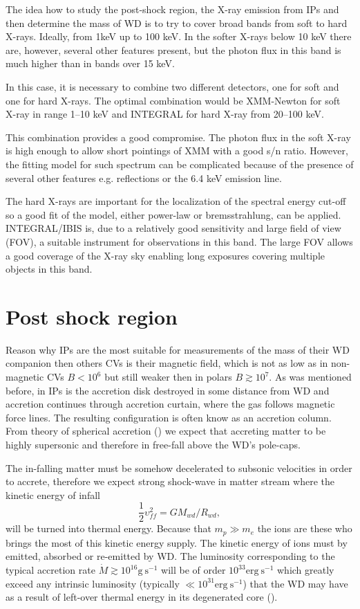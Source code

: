 \documentclass[oneside,a4paper,11pt]{report}
\begin{document}
The idea how to study the post-shock region, the X-ray emission from IPs and then 
determine the mass of WD is to try to cover broad bands from soft to hard X-rays. Ideally, 
from 1keV up to 100 keV. In the softer X-rays below 10 keV there are, however, several other features 
present, but the photon flux in this band is much higher than in bands over 15 keV. 

In this case, it is necessary to combine two different detectors, one for soft and one 
for hard X-rays. The optimal combination would be XMM-Newton for soft X-ray in range 1–10 keV 
and INTEGRAL for hard X-ray from 20–100 keV. 

This combination provides a good compromise. The photon flux in the soft X-ray is high enough 
to allow short pointings of XMM with a good s/n ratio. However, the fitting model for such spectrum 
can be complicated because of the presence of several other features e.g. reflections or the 6.4 keV 
emission line.

The hard X-rays are important for the localization of the spectral energy cut-off so a good fit 
of the model, either power-law or bremsstrahlung, can be applied. INTEGRAL/IBIS is, 
due to a relatively good sensitivity and large field of view (FOV), a suitable instrument 
for observations in this band. The large FOV allows a good coverage 
of the X-ray sky enabling long exposures covering multiple objects in this band.  

\section{Post shock region}
Reason why IPs are the most suitable for measurements of the mass of their WD companion then others CVs 
is their magnetic field, which is not as low as in non-magnetic CVs $B<10^6$ but still weaker then in 
polars $B\gtrsim10^7$. 
As was mentioned before, in IPs is the accretion disk destroyed in some distance from WD and accretion 
continues through accretion curtain, where the gas follows magnetic force lines. 
The resulting configuration is often know as an accretion column. 
From theory of spherical accretion (\citet{accpower:1}) we expect that accreting matter to be highly 
supersonic and therefore in free-fall above the WD's pole-caps. 

The in-falling matter must be somehow decelerated to subsonic velocities in order to accrete, 
therefore we expect strong shock-wave in matter stream where the kinetic energy of infall 
\begin{equation}
\frac{1}{2}\upsilon_{ff}^2 = GM_{wd}/R_{wd}, 
\end{equation}
will be turned into thermal energy. Because that $m_p \gg m_e$ the ions are these who brings the most of this kinetic energy supply. 
The kinetic energy of ions must by emitted, absorbed or re-emitted by WD. The luminosity corresponding 
to the typical accretion rate $\dot{M} \gtrsim 10^{16} \mathrm{g\:s^{-1}}$ will be of order 
$10^{33} \mathrm{erg\:s^{-1}}$ which greatly exceed any intrinsic luminosity (typically 
$\ll 10^{31} \mathrm{erg\:s^{-1}}$) that the WD may have as a result of left-over thermal energy in its 
degenerated core (\citet{accpower:1}).  
\end{document}
